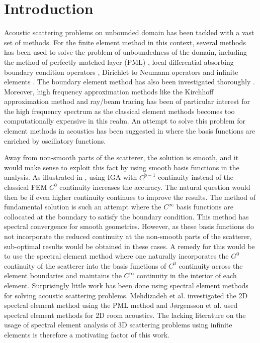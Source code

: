 \section{Introduction}
Acoustic scattering problems on unbounded domain has been tackled with a vast set of methods. For the finite element method in this context, several methods has been used to solve the problem of unboundedness of the domain, including the method of perfectly matched layer (PML) \cite{Bermudez2007aop,Michler2007itp}, local differential absorbing boundary condition operators \cite{Shirron1995soe,Bayliss1982bcf,Hagstrom1998afo,Tezaur2001tdf}, Dirichlet to Neumann operators \cite{Givoli2013nmf} and infinite elements \cite{Ihlenburg1998fea,Bettess1977ie,Bettess1977dar}. The boundary element method has also been investigated thoroughly  \cite{Sauter2011bem,Schanz2007bea,Marburg2008cao,Chandler_Wilde2012nab}. Moreover, high frequency approximation methods like the Kirchhoff approximation method \cite{Foote2002cka,Fillinger2014aen} and ray/beam tracing \cite{Jensen2011coa,Burgschweiger2014rot,Heckbert1984btp} has been of particular interest for the high frequency spectrum as the classical element methods becomes too computationally expensive in this realm. An attempt to solve this problem for element methods in acoustics has been suggested in \cite{Chandler_Wilde2012nab,Peake2013eib,Peake2015eib} where the basis functions are enriched by oscillatory functions.

Away from non-smooth parts of the scatterer, the solution is smooth, and it would make sense to exploit this fact by using smooth basis functions in the analysis. As illustrated in \cite{Venas2018iao}, using IGA with $C^{\check{p}-1}$ continuity instead of the classical FEM $C^0$ continuity increases the accuracy. The natural question would then be if even higher continuity continues to improve the results. The method of fundamental solution \cite{Fairweather2003tmo} is such an attempt where the $C^\infty$ basis functions are collocated at the boundary to satisfy the boundary condition. This method has spectral convergence for smooth geometries. However, as these basis functions do not incorporate the reduced continuity at the non-smooth parts of the scatterer, sub-optimal results would be obtained in these cases. A remedy for this would be to use the spectral element method where one naturally incorporates the $G^0$ continuity of the scatterer into the basis functions of $C^0$ continuity across the element boundaries and maintains the $C^\infty$ continuity in the interior of each element. Surprisingly little work has been done using spectral element methods for solving acoustic scattering problems. Mehdizadeh et al. \cite{Mehdizadeh2003ioa} investigated the 2D spectral element method using the PML method and J{\o}rgensson et al. \cite{Jorgensson2018ras} used spectral element methods for 2D room acoustics. The lacking literature on the usage of spectral element analysis of 3D scattering problems using infinite elements is therefore a motivating factor of this work.